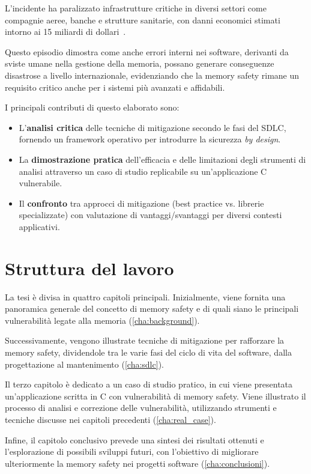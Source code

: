 L'incidente ha paralizzato infrastrutture critiche in diversi settori come
compagnie aeree, banche e strutture sanitarie, con danni economici stimati
intorno ai 15 miliardi di dollari~\cite{crowdstrike_bug_wired_cost}.

Questo episodio dimostra come anche errori interni nei software, derivanti da sviste
umane nella gestione della memoria, possano generare conseguenze disastrose a
livello internazionale, evidenziando che la memory safety rimane un requisito critico
anche per i sistemi più avanzati e affidabili.

\bigskip
\noindent
I principali contributi di questo elaborato sono:
\begin{itemize}
  \item L'\textbf{analisi critica} delle tecniche di mitigazione secondo le fasi
    del SDLC, fornendo un framework operativo per introdurre la sicurezza \textit{by
    design}.

  \item La \textbf{dimostrazione pratica} dell'efficacia e delle limitazioni
    degli strumenti di analisi attraverso un caso di studio replicabile su un'applicazione
    C vulnerabile.

  \item Il \textbf{confronto} tra approcci di mitigazione (best practice vs.
    librerie specializzate) con valutazione di vantaggi/svantaggi per diversi contesti
    applicativi.
\end{itemize}

\section*{Struttura del lavoro}
\label{sec:structure} La tesi è divisa in quattro capitoli principali.
Inizialmente, viene fornita una panoramica generale del concetto di memory safety
e di quali siano le principali vulnerabilità legate alla memoria (\autoref{cha:background}).

Successivamente, vengono illustrate tecniche di mitigazione per rafforzare la
memory safety, dividendole tra le varie fasi del ciclo di vita del software,
dalla progettazione al mantenimento (\autoref{cha:sdlc}).

Il terzo capitolo è dedicato a un caso di studio pratico, in cui viene presentata
un'applicazione scritta in C con vulnerabilità di memory safety. Viene
illustrato il processo di analisi e correzione delle vulnerabilità, utilizzando strumenti
e tecniche discusse nei capitoli precedenti (\autoref{cha:real_case}).

Infine, il capitolo conclusivo prevede una sintesi dei risultati ottenuti e l'esplorazione
di possibili sviluppi futuri, con l'obiettivo di migliorare ulteriormente la memory
safety nei progetti software (\autoref{cha:conclusioni}).